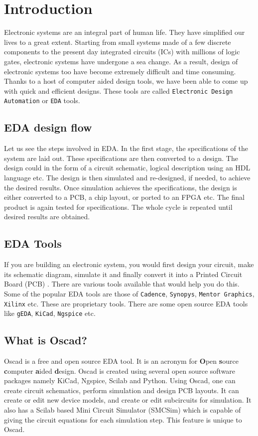 
%


\chapter{Introduction}

Electronic systems are an integral part of human life. They have simplified our lives to a great extent. Starting from small systems made of a few discrete components to the present day integrated circuits (ICs) with millions of logic gates, electronic systems have undergone a sea change. As a result, design of electronic systems too have become extremely difficult and time consuming. Thanks to a host of computer aided design tools, we have been able to come up with quick and efficient designs. These tools are called {\tt Electronic Design Automation} or {\tt EDA} tools.
\section {EDA design flow}
Let us see the steps involved in EDA. In the first stage, the specifications of the system are laid out. These specifications are then converted to a design. The design could in the form of a circuit schematic, logical description using an HDL language etc. The design is then simulated and re-designed, if needed, to achieve the desired results. Once simulation achieves the specifications, the design is either converted to a PCB, a chip layout, or ported to an FPGA etc. The final product is again tested for specifications. The whole cycle is repeated until desired results are obtained.
\section{EDA Tools}
If you are building an electronic system, you would first design your circuit, make its schematic diagram, simulate it and finally convert it into a Printed Circuit Board (PCB) . There are various tools available that would help you do this. Some of the popular EDA tools are those of {\tt Cadence}, {\tt Synopys}, {\tt Mentor Graphics}, {\tt Xilinx} etc. These are proprietary tools. There are some open source EDA tools like {\tt gEDA}, {\tt KiCad}, {\tt Ngspice} etc. 
\section{What is Oscad?}
Oscad is a free and open source EDA tool. It is an acronym for \textbf{O}pen \textbf{s}ource \textbf{c}omputer \textbf{a}ided \textbf{d}esign. Oscad is created using several open source software packages namely KiCad, Ngspice, Scilab and Python. Using Oscad, one can create circuit schematics, perform simulation and design PCB layouts. It can create or edit new device models, and create or edit subcircuits for simulation. It also has a Scilab based Mini Circuit Simulator (SMCSim) which is
capable of giving the circuit equations for each simulation step. This feature is unique to Oscad. 
